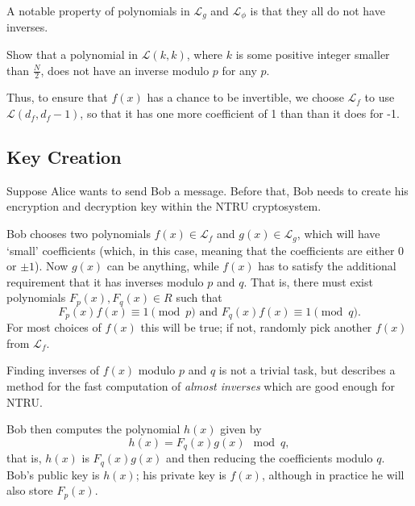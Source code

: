 A notable property of polynomials in $\mathcal{L}_g$ and $\mathcal{L}_\phi$ is that they all do not have inverses.
\begin{exercise}
    Show that a polynomial in $\mathcal{L}(k,k)$, where $k$ is some positive integer smaller than $\frac N2$, does not have an inverse modulo $p$ for any $p$.
\end{exercise}
Thus, to ensure that $f(x)$ has a chance to be invertible, we choose $\mathcal{L}_f$ to use $ \mathcal{L}(d_f, d_f-1)$, so that it has one more coefficient of 1 than than it does for -1.

\subsection{Key Creation}
Suppose Alice wants to send Bob a message. Before that, Bob needs to create his encryption and decryption key within the NTRU cryptosystem.

Bob chooses two polynomials $f(x) \in \mathcal{L}_f$ and $g(x) \in \mathcal{L}_g$, which will have `small' coefficients (which, in this case, meaning that the coefficients are either 0 or $\pm1$). Now $g(x)$ can be anything, while $f(x)$ has to satisfy the additional requirement that it has inverses modulo $p$ and $q$. That is, there must exist polynomials $F_p(x), F_q(x) \in R$ such that
\[
    F_p(x)f(x) \equiv 1 \pmod p \text{ and } F_q(x)f(x) \equiv 1 \pmod q.
\]
For most choices of $f(x)$ this will be true; if not, randomly pick another $f(x)$ from $\mathcal{L}_f$.
\begin{remark}
    Finding inverses of $f(x)$ modulo $p$ and $q$ is not a trivial task, but \cite{silverman_1999} describes a method for the fast computation of \textit{almost inverses} which are good enough for NTRU.
\end{remark}

Bob then computes the polynomial $h(x)$ given by
\[
    h(x) = F_q(x)g(x) \mod q,
\]
that is, $h(x)$ is $F_q(x)g(x)$ and then reducing the coefficients modulo $q$. Bob's public key is $h(x)$; his private key is $f(x)$, although in practice he will also store $F_p(x)$.

